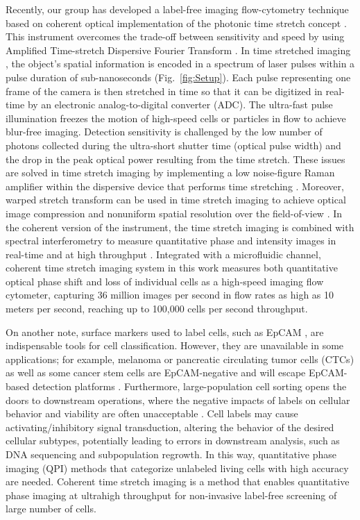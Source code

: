 \documentclass[aps,pra,reprint,superscriptaddress]{revtex4-1}
\begin{document}
Recently, our group has developed a label-free imaging flow-cytometry technique based on coherent optical implementation of the photonic time stretch concept \cite{mahjoubfar2013label}. This instrument overcomes the trade-off between sensitivity and speed by using Amplified Time-stretch Dispersive Fourier Transform \cite{goda2013dispersive, solli2009optical, goda2009theory}. In time stretched imaging \cite{goda2009serial}, the object's spatial information is encoded in a spectrum of laser pulses within a pulse duration of sub-nanoseconds (Fig.~\ref{fig:Setup}). Each pulse representing one frame of the camera is then stretched in time so that it can be digitized in real-time by an electronic analog-to-digital converter (ADC). The ultra-fast pulse illumination freezes the motion of high-speed cells or particles in flow to achieve blur-free imaging. Detection sensitivity is challenged by the low number of photons collected during the ultra-short shutter time (optical pulse width) and the drop in the peak optical power resulting from the time stretch. These issues are solved in time stretch imaging by implementing a low noise-figure Raman amplifier within the dispersive device that performs time stretching \cite{goda2009serial,mahjoubfar2013label,mahjoubfar2013optically}. Moreover, warped stretch transform \cite{jalali2015tailoring} can be used in time stretch imaging to achieve optical image compression and nonuniform spatial resolution over the field-of-view \cite{chen2015optical}. In the coherent version of the instrument, the time stretch imaging is combined with spectral interferometry to measure quantitative phase and intensity images in real-time and at high throughput \cite{mahjoubfar2014label}. Integrated with a microfluidic channel, coherent time stretch imaging system in this work measures both quantitative optical phase shift and loss of individual cells as a high-speed imaging flow cytometer, capturing 36 million images per second in flow rates as high as 10 meters per second, reaching up to 100,000 cells per second throughput.

On another note, surface markers used to label cells, such as EpCAM \cite{gires2009abundance}, are indispensable tools for cell classification. However, they are unavailable in some applications; for example, melanoma or pancreatic circulating tumor cells (CTCs) as well as some cancer stem cells are EpCAM-negative and will escape EpCAM-based detection platforms \cite{kling2012beyond}. Furthermore, large-population cell sorting opens the doors to downstream operations, where the negative impacts of labels on cellular behavior and viability are often unacceptable \cite{boddington2011labeling}. Cell labels may cause activating/inhibitory signal transduction, altering the behavior of the desired cellular subtypes, potentially leading to errors in downstream analysis, such as DNA sequencing and subpopulation regrowth. In this way, quantitative phase imaging (QPI) methods \cite{ikeda2005hilbert,popescu2011quantitative,pham2013real} that categorize unlabeled living cells with high accuracy are needed. Coherent time stretch imaging is a method that enables quantitative phase imaging at ultrahigh throughput for non-invasive label-free screening of large number of cells.
\end{document}

